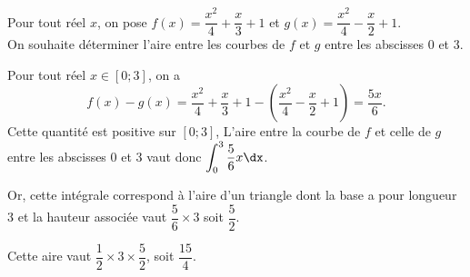 \documentclass[11pt,fleqn, openany]{book} %
\begin{document}
\begin{example}Pour tout réel $x$, on pose $f(x)=\dfrac{x^2}{4}+\dfrac{x}{3}+1$ et $g(x)=\dfrac{x^2}{4}-\dfrac{x}{2}+1$.\\ On souhaite déterminer l'aire entre les courbes de $f$ et $g$ entre les abscisses 0 et 3.


\begin{minipage}{0.25\linewidth}

\end{minipage}\hfill\begin{minipage}{0.72\linewidth}
Pour tout réel $x\in [0;3]$, on a 
\[f(x)-g(x)=\dfrac{x^2}{4}+\dfrac{x}{3}+1-\left(\dfrac{x^2}{4}-\dfrac{x}{2}+1\right)=\dfrac{5x}{6}.\]
Cette quantité est positive sur $[0;3]$, L'aire entre la courbe de $f$ et celle de $g$ entre les abscisses 0 et 3 vaut donc $\displaystyle\int_0^3 \dfrac{5}{6}x\dx$.
\end{minipage}

\begin{minipage}{0.72\linewidth}
Or, cette intégrale correspond à l'aire d'un triangle dont la base a pour longueur 3 et la hauteur associée vaut $\dfrac{5}{6} \times 3$ soit $\dfrac{5}{2}$.

Cette aire vaut $\dfrac{1}{2} \times 3 \times \dfrac{5}{2}$, soit $\dfrac{15}{4}$.
\end{minipage}\hfill\begin{minipage}{0.25\linewidth}
\end{minipage}
\end{example}
\end{document}
